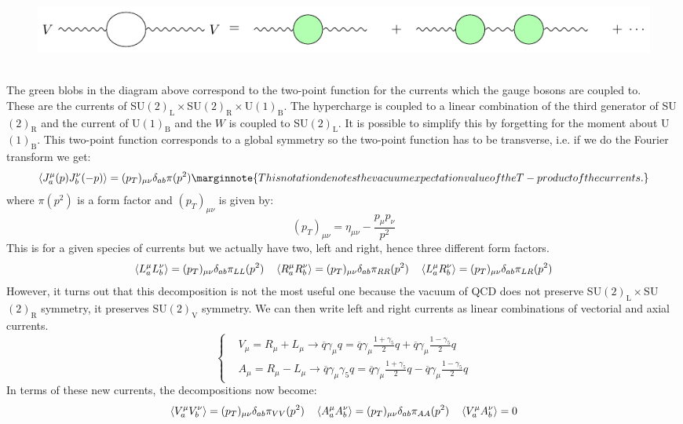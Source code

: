 \documentclass[../main.tex]{subfiles}
\begin{document}
\begin{figure}[h]
    \centering
    \includegraphics[width=1.5\textwidth]{Images/greenblobs.pdf}
    \caption*{}
    \label{greenblobs}
\end{figure}\\
The green blobs in the diagram above correspond to the two-point function for the currents which the gauge bosons are coupled to.\\ 
These are the currents of SU$(2)_{\text{L}}\times$SU$(2)_{\text{R}}\times$U$(1)_{\text{B}}$. The hypercharge is coupled to a linear combination of the third generator of SU$(2)_{\text{R}}$ and the current of U$(1)_{\text{B}}$ and the $W$ is coupled to SU$(2)_{\text{L}}$. It is possible to simplify this by forgetting for the moment about U$(1)_{\text{B}}$. This two-point function corresponds to a global symmetry so the two-point function has to be transverse, i.e. if we do the Fourier transform we get:
\[
\Braket{J_a^\mu(p)J_b^\nu(-p)}=(p_T)_{\mu\nu}\delta_{ab}\pi(p^2)\marginnote{This notation denotes the vacuum expectation value of the T-product of the currents.}
\]
where $\pi(p^2)$ is a form factor and $(p_T)_{\mu\nu}$ is given by:
\[
(p_T)_{\mu\nu}=\eta_{\mu\nu}-\frac{p_\mu p_\nu}{p^2}
\]
This is for a given species of currents but we actually have two, left and right, hence three different form factors. 
\[
\Braket{L_a^\mu L_b^\nu}=(p_T)_{\mu\nu}\delta_{ab}\pi_{LL}(p^2) \quad \Braket{R_a^\mu R_b^\nu}=(p_T)_{\mu\nu}\delta_{ab}\pi_{RR}(p^2) \quad \Braket{L_a^\mu R_b^\nu}=(p_T)_{\mu\nu}\delta_{ab}\pi_{LR}(p^2)
\]
However, it turns out that this decomposition is not the most useful one because the vacuum of QCD does not preserve SU$(2)_{\text{L}}\times$SU$(2)_{\text{R}}$ symmetry, it preserves SU$(2)_{\text{V}}$ symmetry. We can then write left and right currents as linear combinations of vectorial and axial currents.
\[
\left\{
\begin{aligned}
&V_\mu=R_\mu+L_\mu\to\overline{q}\gamma_\mu q=\overline{q}\gamma_\mu\frac{1+\gamma_5}{2}q+\overline{q}\gamma_\mu\frac{1-\gamma_5}{2}q\\
&A_\mu=R_\mu-L_\mu\to\overline{q}\gamma_\mu\gamma_5q=\overline{q}\gamma_\mu\frac{1+\gamma_5}{2}q-\overline{q}\gamma_\mu\frac{1-\gamma_5}{2}q
\end{aligned}
\right.
\]
In terms of these new currents, the decompositions now become:
\[
\Braket{V_a^\mu V_b^\nu}=(p_T)_{\mu\nu}\delta_{ab}\pi_{VV}(p^2) \quad \Braket{A_a^\mu A_b^\nu}=(p_T)_{\mu\nu}\delta_{ab}\pi_{AA}(p^2) \quad \Braket{V_a^\mu A_b^\nu}=0
\]
\end{document}
